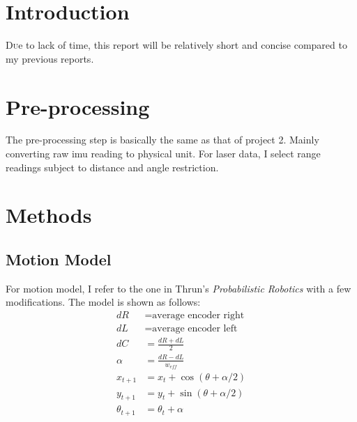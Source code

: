 \documentclass[twoside]{article}
\begin{document}
\begin{multicols}{2} %

\section{Introduction}
\lettrine[nindent=0em,lines=2]{D}ue to lack of time, this report will be relatively short
and concise compared to my previous reports.


\section{Pre-processing}
The pre-processing step is basically the same as that of project 2. Mainly converting raw
imu reading to physical unit. For laser data, I select range readings subject to distance
and angle restriction.


\section{Methods}
\subsection{Motion Model}
For motion model, I refer to the one in Thrun's \textit{Probabilistic Robotics} with a few
modifications. The model is shown as follows:
\begin{align*}
dR &= \mbox{average encoder right} \\
dL &= \mbox{average encoder left} \\
dC &= \frac{dR + dL}{2} \\
\alpha &= \frac{dR-dL}{w_{eff}} \\
x_{t+1} &= x_{t} + \cos(\theta + \alpha/2) \\
y_{t+1} &= y_{t} + \sin(\theta + \alpha/2) \\
\theta_{t+1} &= \theta_t + \alpha
\end{align*}


\end{multicols}
\end{document}
